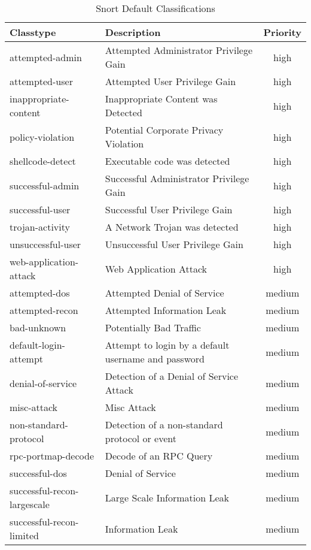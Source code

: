 \documentclass[english]{report}
\begin{document}
\begin{center}
\begin{longtable}[h]{|p{2in}|p{2.5in}|c|}
\caption{Snort Default Classifications}
\label{Snort Default Classifications} \\
\hline 
Classtype & Description & Priority \\
\hline
\hline 
attempted-admin&
Attempted Administrator Privilege Gain & high \\
\hline 
attempted-user&
Attempted User Privilege Gain & high\\
\hline
inappropriate-content&
Inappropriate Content was Detected & high\\
\hline 
policy-violation&
Potential Corporate Privacy Violation & high\\
\hline
shellcode-detect&
Executable code was detected & high\\
\hline 
successful-admin&
Successful Administrator Privilege Gain & high\\
\hline 
successful-user&
Successful User Privilege Gain & high\\
\hline 
trojan-activity&
A Network Trojan was detected & high\\
\hline 
unsuccessful-user&
Unsuccessful User Privilege Gain & high\\
\hline 
web-application-attack&
Web Application Attack & high\\
\hline
attempted-dos&
Attempted Denial of Service & medium\\
\hline 
attempted-recon&
Attempted Information Leak & medium\\
\hline 
bad-unknown&
Potentially Bad Traffic & medium\\
\hline
default-login-attempt&
Attempt to login by a default username and password & medium\\
\hline 
denial-of-service&
Detection of a Denial of Service Attack & medium\\
\hline 
misc-attack&
Misc Attack & medium\\
\hline 
non-standard-protocol&
Detection of a non-standard protocol or event & medium\\
\hline 
rpc-portmap-decode&
Decode of an RPC Query & medium\\
\hline 
successful-dos&
Denial of Service & medium\\
\hline 
successful-recon-largescale&
Large Scale Information Leak & medium\\
\hline 
successful-recon-limited&
Information Leak & medium\\

\end{longtable}
\end{center}
\end{document}
